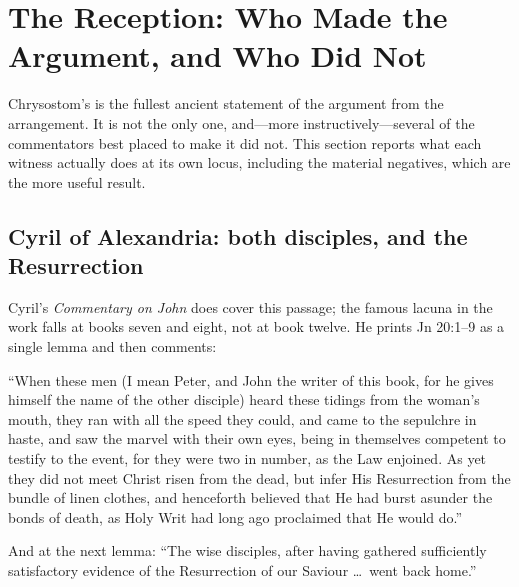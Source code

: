 \section{The Reception: Who Made the Argument, and Who Did Not}

Chrysostom's is the fullest ancient statement of the argument from the
arrangement. It is not the only one, and---more instructively---several of the
commentators best placed to make it did not. This section reports what each
witness actually does at its own locus, including the material negatives, which
are the more useful result.

\subsection{Cyril of Alexandria: both disciples, and the Resurrection}

Cyril's \emph{Commentary on John} does cover this passage; the famous lacuna in
the work falls at books seven and eight, not at book twelve. He prints Jn
20:1--9 as a single lemma and then comments:

\begin{studyframe}\small
``When these men (I mean Peter, and John the writer of this book, for he gives
himself the name of the other disciple) heard these tidings from the woman's
mouth, they ran with all the speed they could, and came to the sepulchre in
haste, and saw the marvel with their own eyes, being in themselves competent to
testify to the event, for they were two in number, as the Law enjoined. As yet
they did not meet Christ risen from the dead, but infer His Resurrection from
the bundle of linen clothes, and henceforth believed that He had burst asunder
the bonds of death, as Holy Writ had long ago proclaimed that He would
do.''
\end{studyframe}

And at the next lemma: ``The wise disciples, after having gathered sufficiently
satisfactory evidence of the Resurrection of our Saviour \ldots\ went back
home.''

